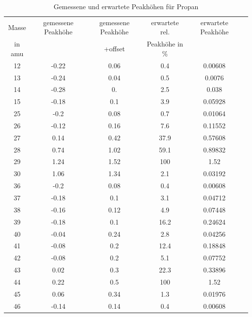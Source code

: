 \begin{table}[]
    \centering
    \caption{Gemessene und erwartete Peakhöhen für Propan}
    \begin{tabular}{cc|cccc}
        Masse  & gemessene Peakhöhe &gemessene Peakhöhe& erwartete rel.  & erwartete Peakhöhe  \\
        in amu & & +offset & Peakhöhe in \% \\\hline
        12 & -0.22&0.06& 0.4  &0.00608 \\
        13 & -0.24&0.04& 0.5  &0.0076\\
        14 & -0.28&0.& 2.5    &0.038\\
        15 & -0.18&0.1& 3.9   &0.05928 \\
        25 & -0.2 &0.08& 0.7  &0.01064 \\
        26 & -0.12&0.16& 7.6  &0.11552 \\
        27 & 0.14 &0.42& 37.9 &0.57608 \\
        28 & 0.74 &1.02& 59.1 &0.89832 \\
        29 & 1.24 &1.52& 100  &1.52 \\
        30 & 1.06 &1.34& 2.1  &0.03192\\
        36 & -0.2 &0.08& 0.4  &0.00608\\
        37 & -0.18&0.1& 3.1   &0.04712\\
        38 & -0.16&0.12& 4.9  &0.07448\\
        39 & -0.18&0.1& 16.2  &0.24624\\
        40 & -0.04&0.24& 2.8  &0.04256\\
        41 & -0.08&0.2& 12.4  &0.18848\\
        42 & -0.08&0.2& 5.1   &0.07752\\
        43 & 0.02 &0.3& 22.3  &0.33896\\
        44 & 0.22 &0.5& 100   &1.52 \\
        45 & 0.06 &0.34& 1.3  &0.01976 \\
        46 & -0.14&0.14& 0.4  &0.00608 \\\hline
    \end{tabular}
    
    \label{tab:MSCracking}
\end{table}

